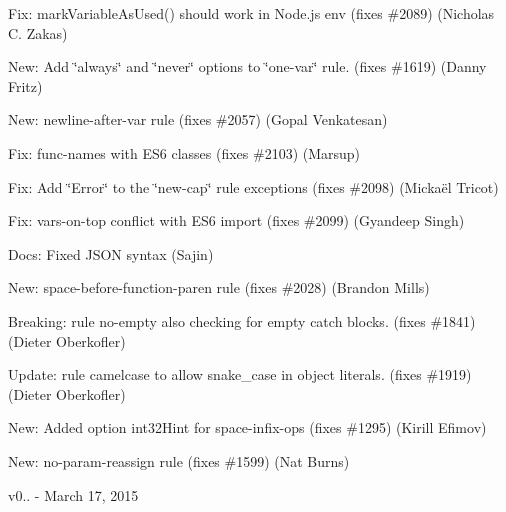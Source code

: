 \begin{DoxyItemize}
\item Fix\+: mark\+Variable\+As\+Used() should work in Node.\+js env (fixes \#2089) (Nicholas C. Zakas)
\item New\+: Add \char`\"{}always\char`\"{} and \char`\"{}never\char`\"{} options to \char`\"{}one-\/var\char`\"{} rule. (fixes \#1619) (Danny Fritz)
\item New\+: newline-\/after-\/var rule (fixes \#2057) (Gopal Venkatesan)
\item Fix\+: func-\/names with E\+S6 classes (fixes \#2103) (Marsup)
\item Fix\+: Add \char`\"{}\+Error\char`\"{} to the \char`\"{}new-\/cap\char`\"{} rule exceptions (fixes \#2098) (Mickaël Tricot)
\item Fix\+: vars-\/on-\/top conflict with E\+S6 import (fixes \#2099) (Gyandeep Singh)
\item Docs\+: Fixed J\+S\+ON syntax (Sajin)
\item New\+: space-\/before-\/function-\/paren rule (fixes \#2028) (Brandon Mills)
\item Breaking\+: rule no-\/empty also checking for empty catch blocks. (fixes \#1841) (Dieter Oberkofler)
\item Update\+: rule camelcase to allow snake\+\_\+case in object literals. (fixes \#1919) (Dieter Oberkofler)
\item New\+: Added option int32\+Hint for space-\/infix-\/ops (fixes \#1295) (Kirill Efimov)
\item New\+: no-\/param-\/reassign rule (fixes \#1599) (Nat Burns)
\end{DoxyItemize}

v0.. -\/ March 17, 2015



